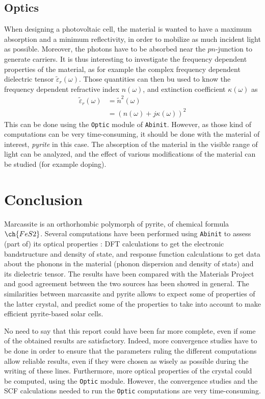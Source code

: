 \documentclass[11pt,a4paper]{article}
\begin{document}
\subsection{Optics}
When designing a photovoltaic cell, the material is wanted to have a maximum absorption and a minimum reflectivity, in order to mobilize as much incident light as possible. Moreover, the photons have to be absorbed near the $pn$-junction to generate carriers. It is thus interesting to investigate the frequency dependent properties of the material, as for example the complex frequency dependent dielectric tensor $\tilde{\varepsilon}_r(\omega)$. Those quantities can then bu used to know the frequency dependent refractive index $n(\omega)$, and extinction coefficient $\kappa(\omega)$ as 
\begin{align}
\tilde{\varepsilon}_r(\omega) &= \tilde{n}^2(\omega)\\
&= (n(\omega)+j\kappa(\omega))^2
\end{align}
This can be done using the \texttt{Optic} module of \texttt{Abinit}. However, as those kind of computations can be very time-consuming, it should be done with the material of interest, \textit{pyrite} in this case. The absorption of the material in the visible range of light can be analyzed, and the effect of various modifications of the material can be studied (for example doping). 
\section{Conclusion}
Marcassite is an orthorhombic polymorph of pyrite, of chemical formula $\ch{FeS2}$. Several computations have been performed using \texttt{Abinit} to assess (part of) its optical properties : DFT calculations to get the electronic bandstructure and density of state, and response function calculations to get data about the phonons in the material (phonon dispersion and density of stats) and its dielectric tensor. The results have been compared with the Materials Project and good agreement between the two sources has been showed in general. The similarities between marcassite and pyrite allows to expect some of properties of the latter crystal, and predict some of the properties to take into account to make efficient pyrite-based solar cells.

No need to say that this report could have been far more complete, even if some of the obtained results are satisfactory. Indeed, more convergence studies have to be done in order to ensure that the parameters ruling the different computations allow reliable results, even if they were chosen as wisely as possible during the writing of these lines. Furthermore, more optical properties of the crystal could be computed, using the \texttt{Optic} module. However, the convergence studies and the SCF calculations needed to run the \texttt{Optic} computations are very time-consuming. 
\end{document}
